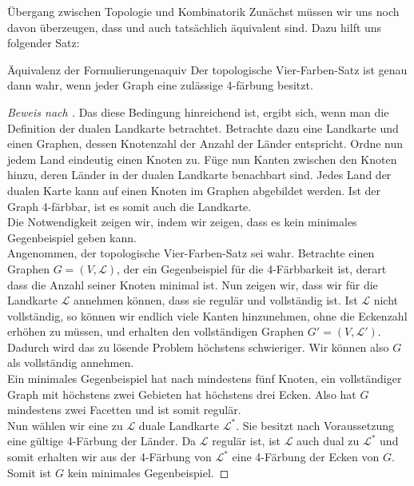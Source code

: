 \begin{chapter}{Übergang zwischen Topologie und Kombinatorik}
 Zunächst müssen wir uns noch davon überzeugen, dass  und  auch tatsächlich äquivalent sind. Dazu hilft uns folgender Satz:
 
 \begin{satzl}{Äquivalenz der Formulierungen}{aquiv}
  Der topologische Vier-Farben-Satz ist genau dann wahr, wenn jeder Graph eine zulässige 4-färbung besitzt.
 \end{satzl}
 \begin{proof}[Beweis nach \cite{fritsch}]
  Das diese Bedingung hinreichend ist, ergibt sich, wenn man die Definition der dualen Landkarte betrachtet. Betrachte dazu eine Landkarte und einen Graphen, dessen Knotenzahl der Anzahl der Länder entspricht. Ordne nun jedem Land eindeutig einen Knoten zu. Füge nun Kanten zwischen den Knoten hinzu, deren Länder in der dualen Landkarte benachbart sind. Jedes Land der dualen Karte kann auf einen Knoten im Graphen abgebildet werden. Ist der Graph 4-färbbar, ist es somit auch die Landkarte.\\
  Die Notwendigkeit zeigen wir, indem wir zeigen, dass es kein minimales Gegenbeispiel geben kann.\\
  Angenommen, der topologische Vier-Farben-Satz sei wahr. Betrachte einen Graphen $G=(V,\mathcal{L})$, der ein Gegenbeispiel für die 4-Färbbarkeit ist, derart dass die Anzahl seiner Knoten minimal ist. Nun zeigen wir, dass wir für die Landkarte $\mathcal{L}$ annehmen können, dass sie regulär und vollständig ist. Ist $\mathcal{L}$ nicht vollständig, so können wir endlich viele Kanten hinzunehmen, ohne die Eckenzahl erhöhen zu müssen, und erhalten den vollständigen Graphen $G' = (V,\mathcal{L}')$. Dadurch wird das zu lösende Problem höchstens schwieriger. Wir können also $G$ als vollständig annehmen. \\
  Ein minimales Gegenbeispiel hat nach  mindestens fünf Knoten, ein vollständiger Graph mit höchstens zwei Gebieten hat höchstens drei Ecken. Also hat $G$ mindestens zwei Facetten und ist somit regulär.\\
  Nun wählen wir eine zu $\mathcal{L}$ duale Landkarte $\mathcal{L}^*$. Sie besitzt nach Voraussetzung eine gültige 4-Färbung der Länder. Da $\mathcal{L}$ regulär ist, ist $\mathcal{L}$ auch dual zu $\mathcal{L}^*$ und somit erhalten wir aus der 4-Färbung von $\mathcal{L}^*$ eine 4-Färbung der Ecken von $G$. Somit ist $G$ kein minimales Gegenbeispiel.
 \end{proof}

\end{chapter}